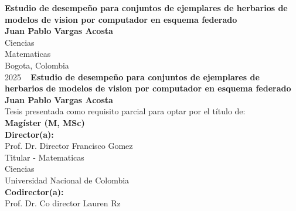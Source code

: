 \documentclass[10pt,spanish,fleqn,openany,twoside,letterpaper]{book}
\newcommand{\studentname}{}
\newcommand{\academictitle}{}
\newcommand{\thesisname}{}
\newcommand{\director}{}
\newcommand{\directortitle}{}
\newcommand{\codirector}{} %
\newcommand{\issuedate}{}
\newcommand{\sede}{}
\newcommand{\department}{}
\newcommand{\faculty}{}
\newcommand{\university}{Universidad Nacional de Colombia}
\renewcommand{\studentname}{Juan Pablo Vargas Acosta}
\renewcommand{\thesisname}{Estudio de desempeño para conjuntos de ejemplares de herbarios de modelos de vision por computador en esquema federado}
\renewcommand{\issuedate}{2025}
\renewcommand{\director}{Prof. Dr. Director Francisco Gomez}
\renewcommand{\directortitle}{Titular}
\renewcommand{\codirector}{Prof. Dr. Co director Lauren Rz}
\renewcommand{\academictitle}{Magíster (M, MSc) }
\renewcommand{\sede}{Bogota}
\renewcommand{\department}{Matematicas}
\renewcommand{\faculty}{Ciencias}
\begin{document}
\renewcommand{\listfigurename}{\sffamily Lista de figuras}
\renewcommand{\listtablename}{\sffamily Lista de tablas}
\renewcommand{\contentsname}{\sffamily Contenido}
\renewcommand{\chaptername}{\sffamily Capítulo}
\renewcommand{\tablename}{\scriptsize \centering \textbf{Tabla}}
\renewcommand{\figurename}{\scriptsize \centering \textbf{Figura}}
\renewcommand{\appendixname}{\sffamily Anexo}

\renewcommand{\bibname}{\sffamily Referencias Bibliográficas}

{\newpage
\thispagestyle{empty}
\begin{center}
\begin{figure}
\centering
{}%
\end{figure}
\vspace{2.5cm}
\textbf{\Huge \thesisname} \\
\vspace{2.5cm}
\textbf{\Large \studentname} \\
\vspace{5.0cm}
\faculty \\ \department \\
\sede, Colombia\\
\issuedate
\newpage 
\
\newpage
\thispagestyle{empty}
\vspace{2.0cm}
\textbf{\Huge \thesisname} \\
\vspace{2.0cm}
\textbf{\Large \studentname} \\
\vspace{2.0cm}
\small Tesis presentada como requisito parcial para optar por el título de: \\
{\bfseries \academictitle}\\
\vspace{2.0cm}
\textbf{Director(a):} \\
\director \\
\directortitle \; - \department \\
\faculty \\
\university \\ 
\vspace{0.5cm}
\textbf{Codirector(a):} \\
\codirector \\

\end{center}}
\end{document}
